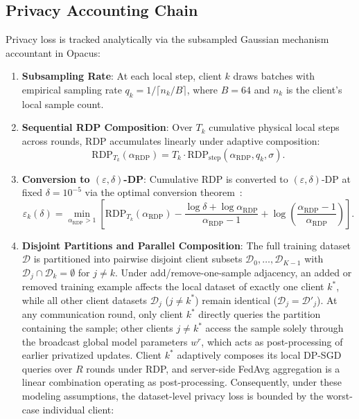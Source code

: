 \documentclass[11pt,a4paper]{article}
\begin{document}
\subsection{Privacy Accounting Chain}
Privacy loss is tracked analytically via the subsampled Gaussian mechanism accountant in Opacus:
\begin{enumerate}
    \item \textbf{Subsampling Rate}: At each local step, client $k$ draws batches with empirical sampling rate $q_k = 1 / \lceil n_k / B \rceil$, where $B=64$ and $n_k$ is the client's local sample count.
    \item \textbf{Sequential RDP Composition}: Over $T_k$ cumulative physical local steps across rounds, RDP accumulates linearly under adaptive composition:
    \begin{equation}
        \text{RDP}_{T_k}(\alpha_{\text{RDP}}) = T_k \cdot \text{RDP}_{\text{step}}(\alpha_{\text{RDP}}, q_k, \sigma).
    \end{equation}
    \item \textbf{Conversion to $(\varepsilon, \delta)$-DP}: Cumulative RDP is converted to $(\varepsilon, \delta)$-DP at fixed $\delta = 10^{-5}$ via the optimal conversion theorem~\cite{balle2020}:
    \begin{equation}
        \varepsilon_k(\delta) = \min_{\alpha_{\text{RDP}} > 1} \left[ \text{RDP}_{T_k}(\alpha_{\text{RDP}}) - \frac{\log \delta + \log \alpha_{\text{RDP}}}{\alpha_{\text{RDP}} - 1} + \log\left(\frac{\alpha_{\text{RDP}} - 1}{\alpha_{\text{RDP}}}\right) \right].
    \end{equation}
    \item \textbf{Disjoint Partitions and Parallel Composition}: The full training dataset $\mathcal{D}$ is partitioned into pairwise disjoint client subsets $\mathcal{D}_0, \dots, \mathcal{D}_{K-1}$ with $\mathcal{D}_j \cap \mathcal{D}_k = \emptyset$ for $j \ne k$. Under add/remove-one-sample adjacency, an added or removed training example affects the local dataset of exactly one client $k^*$, while all other client datasets $\mathcal{D}_j$ ($j \ne k^*$) remain identical ($\mathcal{D}_j = \mathcal{D}'_j$). At any communication round, only client $k^*$ directly queries the partition containing the sample; other clients $j \ne k^*$ access the sample solely through the broadcast global model parameters $w^r$, which acts as post-processing of earlier privatized updates. Client $k^*$ adaptively composes its local DP-SGD queries over $R$ rounds under RDP, and server-side FedAvg aggregation is a linear combination operating as post-processing. Consequently, under these modeling assumptions, the dataset-level privacy loss is bounded by the worst-case individual client:

\end{enumerate}
\end{document}

